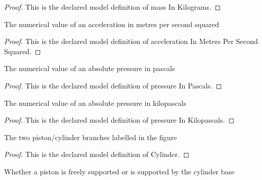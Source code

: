 \begin{proof}
  This is the declared model definition of mass In Kilograms.
\end{proof}
\begin{definition}
  \label{def:physics:phyx-mini-0390:phyxminiproblems-problemphyxmini0390-accelerationinmeterspersecondsquared}
  The numerical value of an acceleration in metres per second squared
\end{definition}
\begin{proof}
  This is the declared model definition of acceleration In Meters Per Second Squared.
\end{proof}
\begin{definition}
  \label{def:physics:phyx-mini-0390:phyxminiproblems-problemphyxmini0390-pressureinpascals}
  The numerical value of an absolute pressure in pascals
\end{definition}
\begin{proof}
  This is the declared model definition of pressure In Pascals.
\end{proof}
\begin{definition}
  \label{def:physics:phyx-mini-0390:phyxminiproblems-problemphyxmini0390-pressureinkilopascals}
  The numerical value of an absolute pressure in kilopascals
\end{definition}
\begin{proof}
  This is the declared model definition of pressure In Kilopascals.
\end{proof}
\begin{definition}[Cylinder]
  \label{def:physics:phyx-mini-0390:phyxminiproblems-problemphyxmini0390-cylinder}
  The two piston/cylinder branches labelled in the figure
\end{definition}
\begin{proof}
  This is the declared model definition of Cylinder.
\end{proof}
\begin{definition}
  \label{def:physics:phyx-mini-0390:phyxminiproblems-problemphyxmini0390-pistonsupportregime}
  Whether a piston is freely supported or is supported by the cylinder base
\end{definition}
